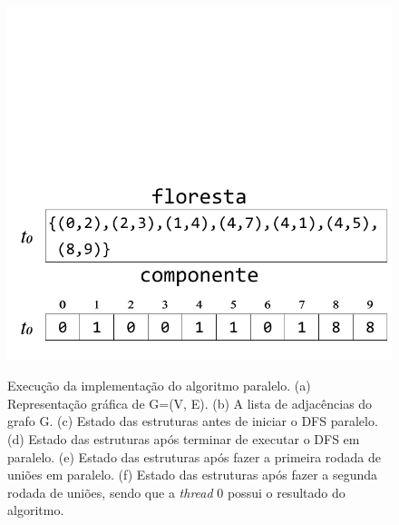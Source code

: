 \documentclass[12pt]{article}
\begin{document}
\begin{figure}[h]
{		\includegraphics[width=\linewidth]{figF.pdf}
	}
	\caption{Execução da implementação do algoritmo paralelo. (a) Representação gráfica de G=(V, E). (b) A lista de adjacências do grafo G. (c) Estado das estruturas antes de iniciar o DFS paralelo. (d) Estado das estruturas após terminar de executar o DFS em paralelo. (e) Estado das estruturas após fazer a primeira rodada de uniões em paralelo. (f) Estado das estruturas após fazer a segunda rodada de uniões, sendo que a \emph{thread} 0 possui o resultado do algoritmo.}
\end{figure}



\end{document}
